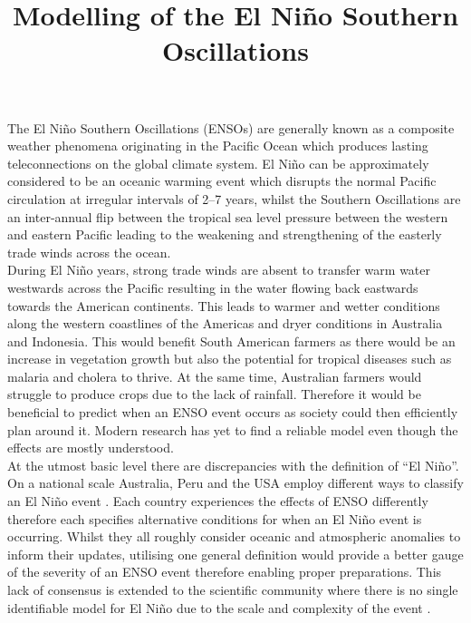 \documentclass[12pt, onecolumn]{revtex4}    %
\begin{document}
                     

\title{Modelling of the El Ni\~{n}o Southern Oscillations} 

\maketitle
\thispagestyle{plain} %

The El Ni\~{n}o Southern Oscillations (ENSOs) are generally known as a composite weather phenomena originating in the Pacific Ocean which produces lasting teleconnections on the global climate system. El Ni\~{n}o can be approximately considered to be an oceanic warming event which disrupts the normal Pacific circulation at irregular intervals of 2--7 years, whilst the Southern Oscillations are an inter-annual flip between the tropical sea level pressure between the western and eastern Pacific leading to the weakening and strengthening of the easterly trade winds across the ocean. \\

During El Ni\~{n}o years, strong trade winds are absent to transfer warm water westwards across the Pacific resulting in the water flowing back eastwards towards the American continents. This leads to warmer and wetter conditions along the western coastlines of the Americas and dryer conditions in Australia and Indonesia. This would benefit South American farmers as there would be an increase in vegetation growth but also the potential for tropical diseases such as malaria and cholera to thrive. At the same time, Australian farmers would struggle to produce crops due to the lack of rainfall. Therefore it would be beneficial to predict when an ENSO event occurs as society could then efficiently plan around it. Modern research has yet to find a reliable model even though the effects are mostly understood. \\

At the utmost basic level there are discrepancies with the definition of ``El Ni\~{n}o''. On a national scale Australia, Peru and the USA employ different ways to classify an El Ni\~{n}o event \citep{doi:10.1175/BAMS-D-16-0009.1}. Each country experiences the effects of ENSO differently therefore each specifies alternative conditions for when an El Ni\~{n}o event is occurring. Whilst they all roughly consider oceanic and atmospheric anomalies to inform their updates, utilising one general definition would provide a better gauge of the severity of an ENSO event therefore enabling proper preparations. This lack of consensus is extended to the scientific community where there is no single identifiable model for El Ni\~{n}o due to the scale and complexity of the event \citep{1997BAMS...78.2771T}. \\
\end{document}
